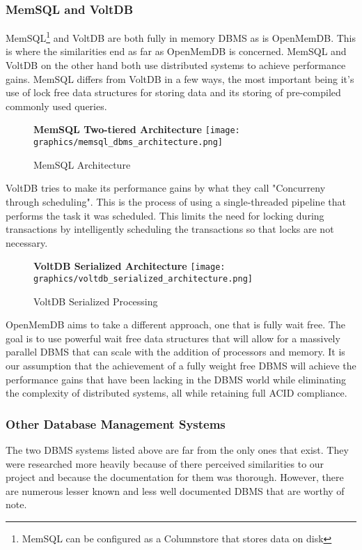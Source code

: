 \documentclass[letterpaper, 12pt]{article}
\begin{document}
\subsubsection{MemSQL and VoltDB}
MemSQL\footnote{MemSQL can be configured as a Columnstore that stores data on disk}
and VoltDB are both fully in memory DBMS as is OpenMemDB. This is where the
similarities end as far as OpenMemDB is concerned. MemSQL and VoltDB on the other
hand both use distributed systems to achieve performance gains. MemSQL differs from
VoltDB in a few ways, the most important being it's use of lock free data structures
for storing data and its storing of pre-compiled commonly used queries\cite{MemSQL}.
\begin{figure}
  \centering
  \textbf{MemSQL Two-tiered Architecture}
  \texttt{[image: graphics/memsql\_dbms\_architecture.png]}
  \caption{MemSQL Architecture}
\end{figure}
VoltDB tries to make its performance gains by what they call "Concurreny through
scheduling"\cite{VoltDB}. This is the process of using a single-threaded pipeline
that performs the task it was scheduled. This limits the need for locking during
transactions by intelligently scheduling the transactions so that locks are not
necessary.
\begin{figure}
  \centering
  \textbf{VoltDB Serialized Architecture}
  \texttt{[image: graphics/voltdb\_serialized\_architecture.png]}
  \caption{VoltDB Serialized Processing}
\end{figure}
\par\vspace{\baselineskip}
OpenMemDB aims to take a different approach, one that is fully wait free. The goal is
to use powerful wait free data structures that will allow for a massively parallel
DBMS that can scale with the addition of processors and memory. It is our assumption
that the achievement of a fully weight free DBMS will achieve the performance gains
that have been lacking in the DBMS world while eliminating the complexity of
distributed systems, all while retaining full ACID compliance.

\subsubsection{Other Database Management Systems}
The two DBMS systems listed above are far from the only ones that exist. They were
researched more heavily because of there perceived similarities to our project and
because the documentation for them was thorough. However, there are numerous lesser
known and less well documented DBMS that are worthy of note.
\end{document}
